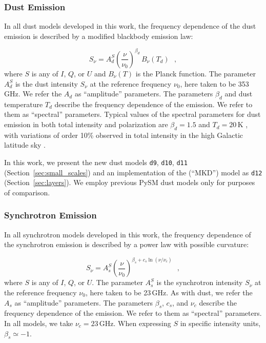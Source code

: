 \documentclass[twocolumn]{aastex631}
\begin{document}
\subsubsection{Dust Emission} \label{subsubsec:dust_model}
In all dust models developed in this work, the frequency dependence of the dust emission is described by a modified blackbody emission law:

\begin{equation} \label{eq:dust-emission-law}
    S_\nu = A_d^S \left(\frac{\nu}{\nu_0}\right)^{\beta_d} \, B_\nu(T_d)
    ~~~,
\end{equation}
where $S$ is any of $I$, $Q$, or $U$ and $B_\nu\left(T\right)$ is the Planck function. The parameter $A_d^S$ is the dust intensity $S_\nu$ at the reference frequency $\nu_0$, here taken to be 353\,GHz. We refer the $A_d$ as ``amplitude'' parameters. The parameters $\beta_d$ and dust temperature $T_d$ describe the frequency dependence of the emission. We refer to them as ``spectral'' parameters. Typical values of the spectral parameters for dust emission in both total intensity and polarization are $\beta_d = 1.5$ and $T_d = 20$\,K \citep{planck2016-l11A}, with variations of order 10\% observed in total intensity in the high Galactic latitude sky \citep[e.g.,][]{planck2014-a12, planck2016-XLVIII}.

In this work, we present the new dust models \texttt{d9}, \texttt{d10}, \texttt{d11} (Section~\ref{sec:small_scales}) and an implementation of the \citet{Martinez-Solaeche:2018} (``MKD'') model as \texttt{d12} (Section~\ref{sec:layers}). We employ previous PySM dust models only for purposes of comparison.

\subsubsection{Synchrotron Emission} \label{subsubsec:synch_model}
In all synchrotron models developed in this work, the frequency dependence of the synchrotron emission is described by a power law with possible curvature:

\begin{equation} \label{eq:synch-emission-law}
    S_\nu = A_s^S \left(\frac{\nu}{\nu_0}\right)^{\beta_s + c_s \ln\left(\nu/\nu_c\right)}
    ~~~,
\end{equation}
where $S$ is any of $I$, $Q$, or $U$. The parameter $A_s^S$ is the synchrotron intensity $S_\nu$ at the reference frequency $\nu_0$, here taken to be 23\,GHz. As with dust, we refer the $A_s$ as ``amplitude'' parameters. The parameters $\beta_s$, $c_s$, and $\nu_c$ describe the frequency dependence of the emission. We refer to them as ``spectral'' parameters. In all models, we take $\nu_c = 23$\,GHz. When expressing $S$ in specific intensity units, $\beta_s \simeq -1$.
\end{document}
